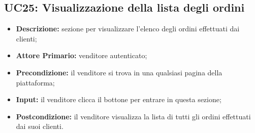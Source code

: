 \subsection{UC25: Visualizzazione della lista degli ordini}
\label{sec:UC25}
\begin{itemize}
    \item \textbf{Descrizione:} sezione per visualizzare l'elenco degli ordini effettuati dai clienti;
    \item \textbf{Attore Primario:} venditore autenticato; 
    \item \textbf{Precondizione:} il venditore si trova in una qualsiasi pagina della piattaforma;
    \item \textbf{Input:} il venditore clicca il bottone per entrare in questa sezione; 
    \item \textbf{Postcondizione:} il venditore visualizza la lista di tutti gli ordini effettuati dai suoi clienti.
\end{itemize}
